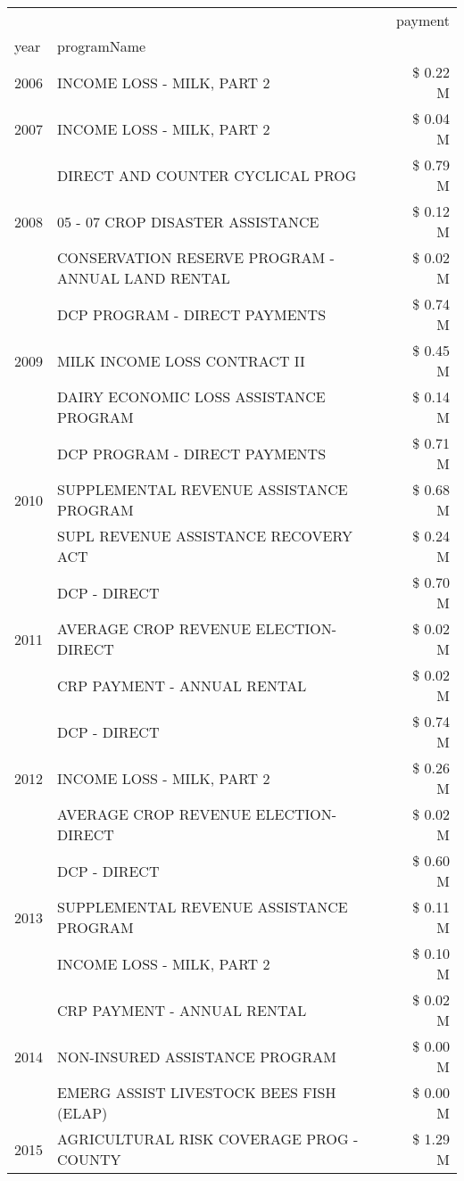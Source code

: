 \begin{tabular}{llr}
\toprule
 &  & payment \\
year & programName &  \\
\midrule
2006 & INCOME LOSS - MILK, PART 2 & \$ 0.22 M \\
\cline{1-3}
2007 & INCOME LOSS - MILK, PART 2 & \$ 0.04 M \\
\cline{1-3}
\multirow[t]{3}{*}{2008} & DIRECT AND COUNTER CYCLICAL PROG & \$ 0.79 M \\
 & 05 - 07 CROP DISASTER ASSISTANCE & \$ 0.12 M \\
 & CONSERVATION RESERVE PROGRAM - ANNUAL LAND RENTAL & \$ 0.02 M \\
\cline{1-3}
\multirow[t]{3}{*}{2009} & DCP PROGRAM - DIRECT PAYMENTS & \$ 0.74 M \\
 & MILK INCOME LOSS CONTRACT II & \$ 0.45 M \\
 & DAIRY ECONOMIC LOSS ASSISTANCE PROGRAM & \$ 0.14 M \\
\cline{1-3}
\multirow[t]{3}{*}{2010} & DCP PROGRAM - DIRECT PAYMENTS & \$ 0.71 M \\
 & SUPPLEMENTAL REVENUE ASSISTANCE PROGRAM & \$ 0.68 M \\
 & SUPL REVENUE ASSISTANCE RECOVERY ACT & \$ 0.24 M \\
\cline{1-3}
\multirow[t]{3}{*}{2011} & DCP - DIRECT & \$ 0.70 M \\
 & AVERAGE CROP REVENUE ELECTION-DIRECT & \$ 0.02 M \\
 & CRP PAYMENT - ANNUAL RENTAL & \$ 0.02 M \\
\cline{1-3}
\multirow[t]{3}{*}{2012} & DCP - DIRECT & \$ 0.74 M \\
 & INCOME LOSS - MILK, PART 2 & \$ 0.26 M \\
 & AVERAGE CROP REVENUE ELECTION-DIRECT & \$ 0.02 M \\
\cline{1-3}
\multirow[t]{3}{*}{2013} & DCP - DIRECT & \$ 0.60 M \\
 & SUPPLEMENTAL REVENUE ASSISTANCE PROGRAM & \$ 0.11 M \\
 & INCOME LOSS - MILK, PART 2 & \$ 0.10 M \\
\cline{1-3}
\multirow[t]{3}{*}{2014} & CRP PAYMENT - ANNUAL RENTAL & \$ 0.02 M \\
 & NON-INSURED ASSISTANCE PROGRAM & \$ 0.00 M \\
 & EMERG ASSIST LIVESTOCK BEES FISH (ELAP) & \$ 0.00 M \\
\cline{1-3}
\multirow[t]{3}{*}{2015} & AGRICULTURAL RISK COVERAGE PROG - COUNTY & \$ 1.29 M \\

\end{tabular}
